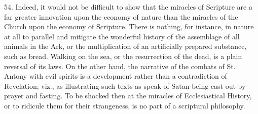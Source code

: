 54.
Indeed, it would not be difficult to show that the miracles of
Scripture are a far greater innovation upon the economy of nature than
the miracles of the Church upon the economy of Scripture. There is
nothing, for instance, in nature at all to parallel and mitigate the
wonderful history of the assemblage of all animals in the Ark,
or the multiplication of an artificially prepared substance, such as
bread. Walking on the sea, or the resurrection of the dead, is a plain
reversal of its laws. On the other hand, the narrative of the combats
of St. Antony with evil spirits is a development rather than a
contradiction of Revelation; viz., as illustrating such texts as speak
of Satan being cast out by prayer and fasting. To be shocked then at
the miracles of Ecclesiastical History, or to ridicule them for their
strangeness, is no part of a scriptural philosophy.


